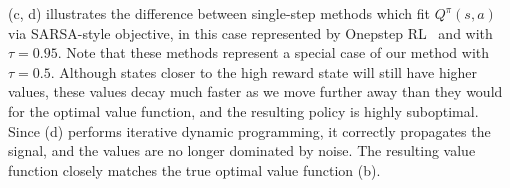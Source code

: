  (c, d) %
illustrates the difference between single-step methods which fit $Q^\pi(s,a)$ via SARSA-style objective, in this case represented by 
Onepstep RL~\citep{brandfonbrener2021offline, wang2018exponentially, gulcehre2021regularized} and \ourname with $\tau=0.95$. Note that these methods represent a special case of our method with $\tau=0.5$.
Although states closer to the high reward state will still have higher values, these values decay much faster as we move further away than they would for the optimal value function, and the resulting policy is highly suboptimal.
Since \ourname (d) performs iterative dynamic programming, it correctly propagates the signal, and the values are no longer dominated by noise. The resulting value function closely matches the true optimal value function (b).


